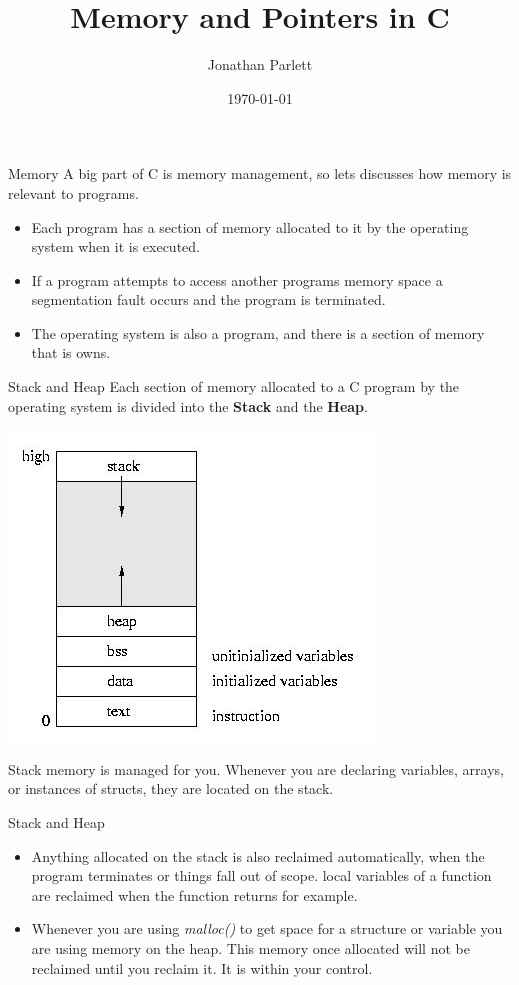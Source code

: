 \documentclass{beamer}
\title{Memory and Pointers in C}
\author{Jonathan Parlett}
\date{\today}
\begin{document}
\begin{frame}
    \titlepage
\end{frame}

\begin{frame}{Memory}
	A big part of C is memory management, so lets discusses how memory is relevant to programs.

	\begin{itemize}
		\item Each program has a section of memory allocated to it by the operating system when it is executed. 
		\item If a program attempts to access another programs memory space a segmentation fault occurs and the program is terminated.
		\item The operating system is also a program, and there is a section of memory that is owns.
	\end{itemize}
\end{frame}

\begin{frame}{Stack and Heap}
	Each section of memory allocated to a C program by the operating system is divided into the {\bf Stack} and the {\bf Heap}.

	\includegraphics[scale=0.40]{imgs/stackandheap.jpeg}

	Stack memory is managed for you. Whenever you are declaring variables, arrays, or instances of structs, they are located on the stack.
\end{frame}

\begin{frame}{Stack and Heap}
	\begin{itemize}
	\item Anything allocated on the stack is also reclaimed automatically, when the program terminates or things fall out of scope. local variables of a function are reclaimed when the function returns for example.

	\item Whenever you are using {\it malloc()} to get space for a structure or variable you are using memory on the heap. This memory once allocated will not be reclaimed until you reclaim it. It is within your control.
	\end{itemize}
\end{frame}
\end{document}
